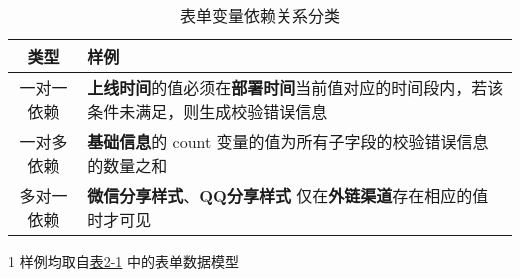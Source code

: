 \begin{table}[H]
    \centering

    \begin{threeparttable}
        \small

        \begin{tabular}{|c|p{12cm}<{\centering}|}
            \hline
            类型       & 样例                                                                                               \\ \hline
            一对一依赖 & \textbf{上线时间}的值必须在\textbf{部署时间}当前值对应的时间段内，若该条件未满足，则生成校验错误信息 \\ \hline
            一对多依赖 & \textbf{基础信息}的 count 变量的值为所有子字段的校验错误信息的数量之和                        \\ \hline
            多对一依赖 & \textbf{微信分享样式}、\textbf{QQ分享样式} 仅在\textbf{外链渠道}存在相应的值时才可见               \\ \hline
        \end{tabular}

        \begin{tablenotes}
            \item [1] 样例均取自\hyperref[kaola-activity-configuration-form-model]{表2-1} 中的表单数据模型

        \end{tablenotes}

        \normalsize
    \end{threeparttable}

    \caption{表单变量依赖关系分类}
    \label{dependency-situations}
\end{table}